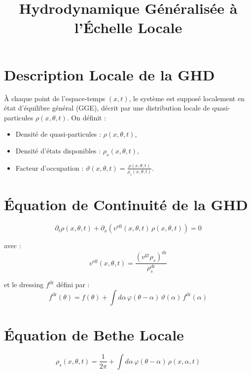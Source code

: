 \documentclass[11pt]{article}
\title{Hydrodynamique Généralisée à l'Échelle Locale}
\author{}
\date{}
\begin{document}
\maketitle

\section*{Description Locale de la GHD}

À chaque point de l’espace-temps $(x,t)$, le système est supposé localement en état d'équilibre général (GGE), décrit par une distribution locale de quasi-particules $\rho(x,\theta,t)$. On définit :

\begin{itemize}
    \item Densité de quasi-particules : $\rho(x,\theta,t)$,
    \item Densité d'états disponibles : $\rho_s(x,\theta,t)$,
    \item Facteur d'occupation : $\vartheta(x,\theta,t) = \frac{\rho(x,\theta,t)}{\rho_s(x,\theta,t)}$.
\end{itemize}

\section*{Équation de Continuité de la GHD}

\begin{equation}
\partial_t \rho(x,\theta,t) + \partial_x \left( v^{\text{eff}}(x,\theta,t)\, \rho(x,\theta,t) \right) = 0
\end{equation}

avec :
\begin{equation}
v^{\text{eff}}(x,\theta,t) = \frac{ (v^{\text{gr}} \rho_s)^{\text{dr}} }{ \rho_s^{\text{dr}} }
\end{equation}

et le dressing $f^{\text{dr}}$ défini par :
\begin{equation}
f^{\text{dr}}(\theta) = f(\theta) + \int d\alpha\, \varphi(\theta - \alpha)\, \vartheta(\alpha)\, f^{\text{dr}}(\alpha)
\end{equation}

\section*{Équation de Bethe Locale}

\begin{equation}
\rho_s(x,\theta,t) = \frac{1}{2\pi} + \int d\alpha\, \varphi(\theta - \alpha)\, \rho(x,\alpha,t)
\end{equation}
\end{document}

